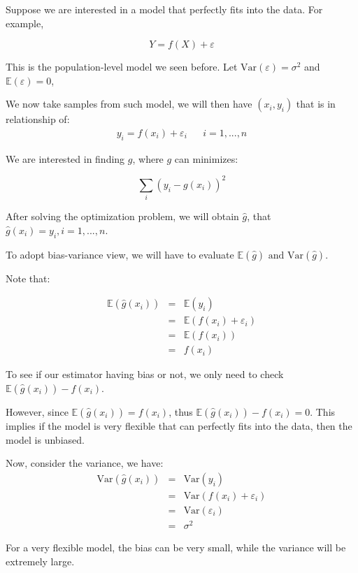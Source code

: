\documentclass{article}
\theoremstyle{MyNonumberplain}
\theoremstyle{break}
\newcommand{\ev}{\mathbb{E}}
\newcommand{\var}{\text{Var}}
\theoremstyle{break}
\theoremstyle{break}
\theoremstyle{break}
\begin{document}
Suppose we are interested in a model that perfectly fits into the data. For example,

$$Y=f(X)+\varepsilon$$

This is the population-level model we seen before. Let $\text{Var}(\varepsilon)=\sigma^2$ and $\ev{(\varepsilon)}=0$,

We now take samples from such model, we will then have $(x_i,y_i)$ that is in relationship of:
\begin{eqnarray*}
    y_i=f(x_i)+\varepsilon_i &  & i=1,...,n
\end{eqnarray*}

We are interested in finding $g$, where $g$ can minimizes:

$$\sum_{i}(y_i-g(x_i))^2$$

After solving the optimization problem, we will obtain $\hat{g}$, that $\hat{g}(x_i)=y_i, i=1,...,n$.

To adopt bias-variance view, we will have to evaluate $\ev(\hat{g})\text{ and Var}(\hat{g})$.

Note that:

\begin{eqnarray*}
    \ev(\hat{g}(x_i)) &=& \ev(y_i)\\
                      &=& \ev(f(x_i)+\varepsilon_i)\\
                      &=& \ev(f(x_i))\\
                      &=& f(x_i)
\end{eqnarray*}

To see if our estimator having bias or not, we only need to check $\ev(\hat{g}(x_i))-f(x_i)$.

However, since $\ev(\hat{g}(x_i))=f(x_i)$, thus $\ev(\hat{g}(x_i))-f(x_i)=0$. This implies if the model is very flexible
that can perfectly fits into the data, then the model is unbiased. 

Now, consider the variance, we have: 
\begin{eqnarray*}
    \var(\hat{g}(x_i)) &=& \var(y_i)\\
                       &=& \var(f(x_i)+\varepsilon_i)\\
                       &=& \var(\varepsilon_i)\\
                       &=& \sigma^2
\end{eqnarray*}
 
For a very flexible model, the bias can be very small, while the variance will be extremely large. 
\end{document}

